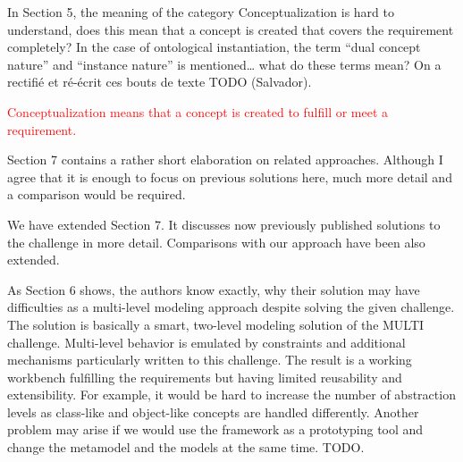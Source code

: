 \documentclass[10pt]{article}
\begin{document}
\begin{response}{In Section 5, the meaning of the category Conceptualization is hard to understand, does this mean that a concept is created that covers the requirement completely? In the case of ontological instantiation, the term “dual concept nature” and “instance nature” is mentioned… what do these terms mean?} 
On a rectifié et ré-écrit ces bouts de texte
TODO (Salvador).

\textcolor{red}{Conceptualization means that a concept is created to fulfill or meet a requirement. }

\end{response}

\begin{response}{Section 7 contains a rather short elaboration on related approaches. Although I agree that it is enough to focus on previous solutions here, much more detail and a comparison would be required.} 

We have extended Section 7. It discusses now previously published solutions to the challenge in more detail. Comparisons with our approach have been also extended.

\end{response}

\begin{response}{As Section 6 shows, the authors know exactly, why their solution may have difficulties as a multi-level modeling approach despite solving the given challenge. The solution is basically a smart, two-level modeling solution of the MULTI challenge. Multi-level behavior is emulated by constraints and additional mechanisms particularly written to this challenge. The result is a working workbench fulfilling the requirements but having limited reusability and extensibility. For example, it would be hard to increase the number of abstraction levels as class-like and object-like concepts are handled differently. Another problem may arise if we would use the framework as a prototyping tool and change the metamodel and the models at the same time.} 
TODO.
\end{response}
\end{document}
